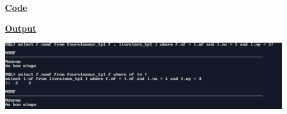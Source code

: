 \newpage
{}

\textbf{\underline{Code}}


\vspace{1cm}
\textbf{\underline{Output}}
\vspace{1cm}
\begin{center}
    \includegraphics[width=0.9\textwidth]{Questions/q15/q15.png}
\end{center}


